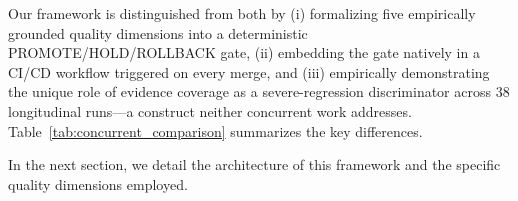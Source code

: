 Our framework is distinguished from both by (i) formalizing five empirically grounded quality dimensions into a deterministic PROMOTE/HOLD/ROLLBACK gate, (ii) embedding the gate natively in a CI/CD workflow triggered on every merge, and (iii) empirically demonstrating the unique role of evidence coverage as a severe-regression discriminator across 38 longitudinal runs---a construct neither concurrent work addresses. Table~\ref{tab:concurrent_comparison} summarizes the key differences.



In the next section, we detail the architecture of this framework and the specific quality dimensions employed.

